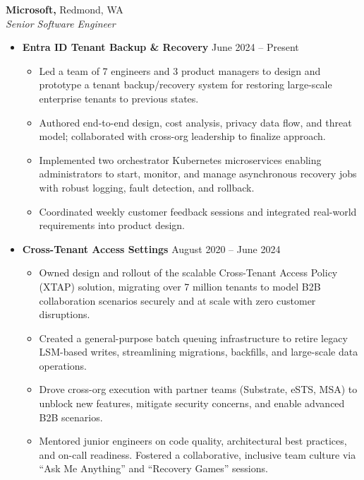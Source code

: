 \documentclass[11pt]{article}
\begin{document}
\noindent
\textbf{Microsoft,} Redmond, WA\\
\emph{Senior Software Engineer} 
\begin{itemize}[noitemsep,nolistsep,leftmargin=*,label={-}]
    \item \textbf{Entra ID Tenant Backup \& Recovery} \hfill{June 2024 -- Present}
    \begin{itemize}[noitemsep,nolistsep]
        \item Led a team of 7 engineers and 3 product managers to design and prototype a tenant backup/recovery system for restoring large-scale enterprise tenants to previous states.
        \item Authored end-to-end design, cost analysis, privacy data flow, and threat model; collaborated with cross-org leadership to finalize approach.
        \item Implemented two orchestrator Kubernetes microservices enabling administrators to start, monitor, and manage asynchronous recovery jobs with robust logging, fault detection, and rollback.
        \item Coordinated weekly customer feedback sessions and integrated real-world requirements into product design.
    \end{itemize}

    \item \textbf{Cross-Tenant Access Settings} \hfill{August 2020 -- June 2024}
    \begin{itemize}[noitemsep,nolistsep]
        \item Owned design and rollout of the scalable Cross-Tenant Access Policy (XTAP) solution, migrating over 7 million tenants to model B2B collaboration scenarios securely and at scale with zero customer disruptions.
        \item Created a general-purpose batch queuing infrastructure to retire legacy LSM-based writes, streamlining migrations, backfills, and large-scale data operations.
        \item Drove cross-org execution with partner teams (Substrate, eSTS, MSA) to unblock new features, mitigate security concerns, and enable advanced B2B scenarios.
        \item Mentored junior engineers on code quality, architectural best practices, and on-call readiness. Fostered a collaborative, inclusive team culture via “Ask Me Anything” and “Recovery Games” sessions.
    \end{itemize}
\end{itemize}
\end{document}
